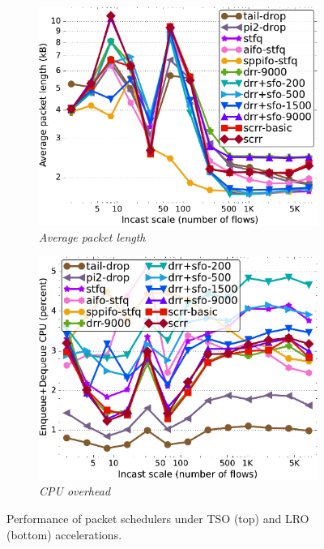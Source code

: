 \begin{figure}[t]
\begin{subfigure}[t]{.30\linewidth}
    \includegraphics[width=0.95\linewidth]{figs/paral_cn_1t4x1024_gro_skblen_comp_methods.pdf}
    \caption{\small{\textit{Average packet length}}}
    \label{fig:gro-avg-full}
  \end{subfigure}
  \begin{subfigure}[t]{.30\linewidth}
    \centering
    \includegraphics[width=0.95\linewidth]{figs/paral_cn_1t4x1024_gro_kp_comp_methods.pdf}
    \caption{\small{\textit{CPU overhead}}}
    \label{fig:gro-cpu-full}
  \end{subfigure}
  \vspace{-3mm}
  \caption{\small{Performance of packet schedulers under TSO (top) and LRO (bottom) accelerations.}}
  \label{fig:gsogro-full}
  \vspace{-0.2cm}
\end{figure}

